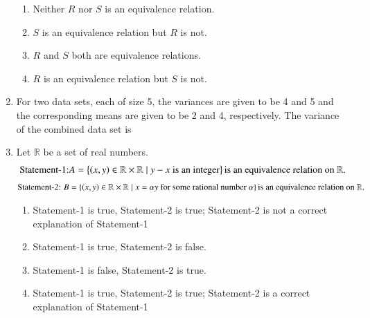 \documentclass[journal,12pt,twocolumn]{IEEEtran}
\theoremstyle{remark}
\begin{document}
\begin{enumerate}
    \hfill{}
    \begin{enumerate}
        \item Neither $R$ nor $S$ is an equivalence relation.
        \item $S$ is an equivalence relation but $R$ is not.
        \item $R$ and $S$ both are equivalence relations.
        \item $R$ is an equivalence relation but $S$ is not.
    \end{enumerate}
    
    \item For two data sets, each of size 5, the variances are given to be 4 and 5 and the corresponding means are given to be 2 and 4, respectively. The variance of the combined data set is
    
    \hfill{}
    \begin{enumerate}
    \end{enumerate}
    
    \item Let $\mathbb{R}$ be a set of real numbers. \newline
	    \begin{align*} \text{Statement-1:} A = \left\{\left(x, y\right) \in \mathbb{R}  \times \mathbb{R}  \mid y - x \text{ is an integer}\right\} \text{is an equivalence relation on }\mathbb{R}.
	\end{align*}
	\begin{align*}
		\text{Statement-2: }B = \left\{\left(x, y\right) \in \mathbb{R} \times \mathbb{R}  \mid x = \alpha y \text{ for some rational number } \alpha \right\} \text{is an equivalence relation on }\mathbb{R}.
	\end{align*}

    \hfill{}
    \begin{enumerate}
        \item Statement-1 is true, Statement-2 is true; Statement-2 is not a correct explanation of Statement-1
        \item Statement-1 is true, Statement-2 is false.
        \item Statement-1 is false, Statement-2 is true.
        \item Statement-1 is true, Statement-2 is true; Statement-2 is a correct explanation of Statement-1
    \end{enumerate}
    

\end{enumerate}
\end{document}
